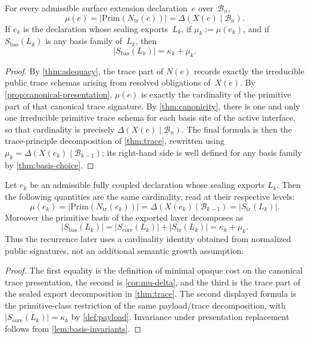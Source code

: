 \documentclass{lmcs}
\newcommand{\B}{\mathcal{B}}
\newcommand{\Prim}{\mathrm{Prim}}
\begin{document}
\begin{cor}
\label{cor:mu-delta}
For every admissible surface extension declaration~$e$ over~$\B_n$,
\[
  \mu(e) = |\Prim(N_{\mathrm{tr}}(e))| = \Delta(X(e)\mid\B_n).
\]
If $e_k$ is the declaration whose sealing exports~$L_k$, if $\mu_k := \mu(e_k)$,
and if $S_{\mathrm{bas}}(L_k)$ is any basis family of~$L_k$, then
\[
  |S_{\mathrm{bas}}(L_k)| = \kappa_k + \mu_k.
\]
\end{cor}

\begin{proof}
By \autoref{thm:adequacy}, the trace part of $N(e)$ records exactly the
irreducible public trace schemas arising from resolved obligations of~$X(e)$.
By \autoref{prop:canonical-presentation}, $\mu(e)$ is exactly the cardinality
of the primitive part of that canonical trace signature. By \autoref{thm:canonicity}, there is one and
only one irreducible primitive trace schema for each basis site of the active
interface, so that cardinality is precisely $\Delta(X(e)\mid\B_n)$. The final
formula is then the trace-principle decomposition of \autoref{thm:trace},
rewritten using $\mu_k=\Delta(X(e_k)\mid\B_{k-1})$; its right-hand side is
well defined for any basis family by \autoref{thm:basis-choice}.
\end{proof}

\begin{lem}
\label{lem:trace-cost-dictionary}
Let $e_k$ be an admissible fully coupled declaration whose sealing exports
$L_k$. Then the following quantities are the same cardinality, read at their
respective levels:
\[
  \mu(e_k)
  =
  |\Prim(N_{\mathrm{tr}}(e_k))|
  =
  \Delta(X(e_k)\mid\B_{k-1})
  =
  |S_{\mathrm{tr}}(L_k)|.
\]
Moreover the primitive basis of the exported layer decomposes as
\[
  |S_{\mathrm{bas}}(L_k)|
  =
  |S_{\mathrm{core}}(L_k)|+|S_{\mathrm{tr}}(L_k)|
  =
  \kappa_k+\mu_k.
\]
Thus the recurrence later uses a cardinality identity obtained from normalized
public signatures, not an additional semantic growth assumption.
\end{lem}

\begin{proof}
The first equality is the definition of minimal opaque cost on the canonical
trace presentation, the second is \autoref{cor:mu-delta}, and the third is the
trace part of the sealed export decomposition in \autoref{thm:trace}. The
second displayed formula is the primitive-class restriction of the same
payload/trace decomposition, with $|S_{\mathrm{core}}(L_k)|=\kappa_k$ by
\autoref{def:payload}. Invariance under presentation replacement follows from
\autoref{lem:basis-invariants}.
\end{proof}
\end{document}
